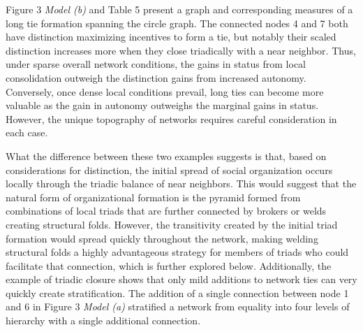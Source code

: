 \documentclass[12pt]{article}
\begin{document}
Figure 3 \textit{Model (b)} and Table 5 present a graph and corresponding measures of a long tie formation spanning the circle graph. The connected nodes 4 and 7 both have distinction maximizing incentives to form a tie, but notably their scaled distinction increases more when they close triadically with a near neighbor. Thus, under sparse overall network conditions, the gains in status from local consolidation outweigh the distinction gains from increased autonomy. Conversely, once dense local conditions prevail, long ties can become more valuable as the gain in autonomy outweighs the marginal gains in status. However, the unique topography of networks requires careful consideration in each case.

What the difference between these two examples suggests is that, based on considerations for distinction, the initial spread of social organization occurs locally through the triadic balance of near neighbors. This would suggest that the natural form of organizational formation is the pyramid formed from combinations of local triads that are further connected by brokers or welds creating structural folds. However, the transitivity created by the initial triad formation would spread quickly throughout the network, making welding structural folds a highly advantageous strategy for members of triads who could facilitate that connection, which is further explored below. Additionally, the example of triadic closure shows that only mild additions to network ties can very quickly create stratification. The addition of a single connection between node 1 and 6 in Figure 3 \textit{Model (a)} stratified a network from equality into four levels of hierarchy with a single additional connection. 
\end{document}
